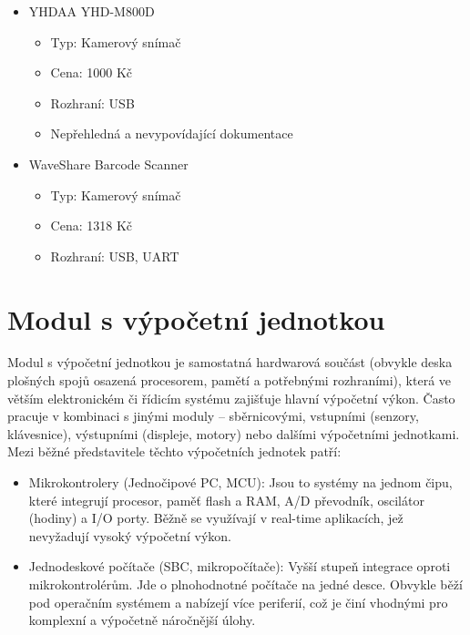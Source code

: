 \begin{itemize}
    \item YHDAA YHD-M800D
    \begin{itemize}
        \item Typ: Kamerový snímač
        \item Cena: 1000 Kč
        \item Rozhraní: USB
        \item Nepřehledná a nevypovídající dokumentace
    \end{itemize}
    \item WaveShare Barcode Scanner
    \begin{itemize}
        \item Typ: Kamerový snímač
        \item Cena: 1318 Kč
        \item Rozhraní: USB, UART
    \end{itemize}
\end{itemize}



\section{Modul s výpočetní jednotkou} %

Modul s výpočetní jednotkou je samostatná hardwarová součást (obvykle deska plošných spojů osazená procesorem, pamětí a potřebnými rozhraními), která ve větším elektronickém či řídicím systému zajišťuje hlavní výpočetní výkon. Často pracuje v kombinaci s jinými moduly – sběrnicovými, vstupními (senzory, klávesnice), výstupními (displeje, motory) nebo dalšími výpočetními jednotkami. Mezi běžné představitele těchto výpočetních jednotek patří:
\begin{itemize}
    \item Mikrokontrolery (Jednočipové PC, MCU): Jsou to systémy na jednom čipu, které integrují procesor, paměť flash a RAM, A/D převodník, oscilátor (hodiny) a I/O porty. Běžně se využívají v real-time aplikacích, jež nevyžadují vysoký výpočetní výkon.
    \item Jednodeskové počítače (SBC, mikropočítače): Vyšší stupeň integrace oproti mikrokontrolérům. Jde o plnohodnotné počítače na jedné desce. Obvykle běží pod operačním systémem a nabízejí více periferií, což je činí vhodnými pro komplexní a výpočetně náročnější úlohy.
\end{itemize}


